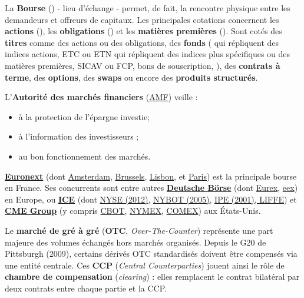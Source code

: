 \def\scaleBS{.95}

\begin{f}
	
La \textbf{Bourse} () - lieu d'échange - permet, de fait, la rencontre physique entre les demandeurs et offreurs de capitaux.
Les principales cotations concernent les \textbf{actions} (), les \textbf{obligations} () et les \textbf{matières premières} ().
Sont cotés des \textbf{titres} comme des actions ou des obligations, des \textbf{fonds} ( qui répliquent des indices actions, ETC ou ETN qui répliquent des indices plus spécifiques ou des matières premières, SICAV ou FCP, bons de souscription, ), des \textbf{contrats à terme},  des \textbf{options}, des \textbf{swaps} ou encore des \textbf{produits structurés}.

L'\textbf{Autorité des marchés financiers} (\href{https://www.amf-france.org/fr}{AMF})  veille :
\begin{itemize}
	\item à la protection de l'épargne investie; 
	\item à l'information des investisseurs ; 
	\item au bon fonctionnement des marchés. 
\end{itemize}

\textbf{\href{https://www.euronext.com/fr}{Euronext}} (dont
\href{https://www.euronext.com/en/markets/amsterdam}{Amsterdam}, 
\href{https://www.euronext.com/en/markets/brussels}{Brussels}, 
\href{https://www.euronext.com/en/markets/lisbon}{Lisbon}, 
et \href{https://www.euronext.com/en/markets/paris}{Paris}) est la principale bourse en France. 
%
Ses concurrents sont entre autres \textbf{\href{https://www.deutsche-boerse.com/dbg-en/}{Deutsche Börse}} 
(dont \href{https://www.eurex.com/}{Eurex}, 
\href{https://www.eex.com/en/}{eex}) en Europe, 
%
ou \textbf{\href{https://www.ice.com/}{ICE}} (dont
\href{https://www.nyse.com/index}{NYSE (2012)}, 
\href{https://www.ice.com/about/history}{NYBOT (2005)}, 
\href{https://www.ice.com/futures-europe}{IPE (2001), LIFFE}) 
%
et \textbf{\href{https://www.cmegroup.com/}{CME Group}} (y compris
\href{https://www.cmegroup.com/company/cbot.html}{CBOT}, 
\href{https://www.cmegroup.com/company/nymex.html}{NYMEX}, 
\href{https://www.cmegroup.com/company/comex.html}{COMEX}) aux États-Unis.

Le \textbf{marché de gré à gré} (\textbf{OTC}, \textit{Over-The-Counter}) représente une part majeure des volumes échangés hors marchés organisés.
Depuis le G20 de Pittsburgh (2009), certains dérivés OTC standardisés doivent être compensés via une entité centrale.
Ces \textbf{CCP} (\textit{Central Counterparties}) jouent ainsi le rôle de \textbf{chambre de compensation} (\textit{clearing}) : elles remplacent le contrat bilatéral par deux contrats entre chaque partie et la CCP.


\end{f}
